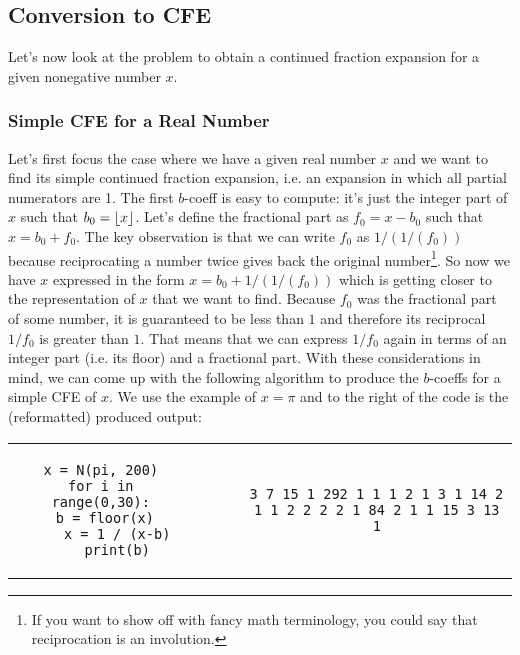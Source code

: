 




\subsection{Conversion to CFE}
Let's now look at the problem to obtain a continued fraction expansion for a given nonegative number $x$.


\subsubsection{Simple CFE for a Real Number}
Let's first focus the case where we have a given real number $x$ and we want to find its simple continued fraction expansion, i.e. an expansion in which all partial numerators are 1. The first $b$-coeff is easy to compute: it's just the integer part of $x$ such that $b_0 = \lfloor x\rfloor$. Let's define the fractional part as $f_0 = x - b_0$ such that $x = b_0 + f_0$. The key observation is that we can write $f_0$ as $1/(1/(f_0))$ because reciprocating a number twice gives back the original number\footnote{If you want to show off with fancy math terminology, you could say that reciprocation is an involution.}. So now we have $x$ expressed in the form $x = b_0 + 1/(1/(f_0))$ which is getting closer to the representation of $x$ that we want to find. Because $f_0$ was the fractional part of some number, it is guaranteed to be less than $1$ and therefore its reciprocal $1/f_0$ is greater than $1$. That means that we can express $1/f_0$ again in terms of an integer part (i.e. its floor) and a fractional part. With these considerations in mind, we can come up with the following algorithm to produce the $b$-coeffs for a simple CFE of $x$. We use the example of $x = \pi$ and to the right of the code is the (reformatted) produced output:
\begin{center}
\begin{tabular}{ ccccc } 
\begin{lstlisting}
x = N(pi, 200)
for i in range(0,30):
    b = floor(x)   
    x = 1 / (x-b)
    print(b)
\end{lstlisting}
& & \vline & &
\begin{lstlisting}
3 7 15 1 292 1 1 1 2 1 3 1 14 2 
1 1 2 2 2 2 1 84 2 1 1 15 3 13 1
\end{lstlisting}
\end{tabular}
\end{center}
